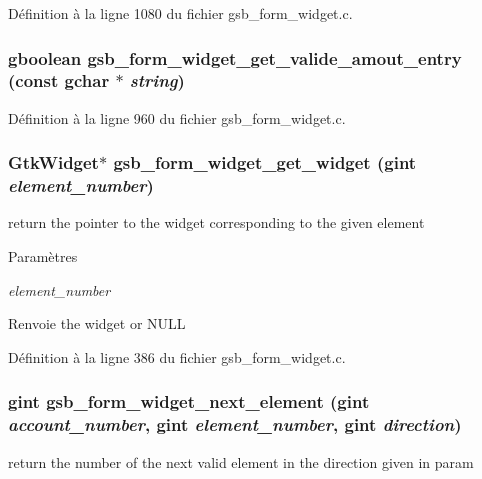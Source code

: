 Définition à la ligne 1080 du fichier gsb\_\-form\_\-widget.c.

\subsubsection[{gsb\_\-form\_\-widget\_\-get\_\-valide\_\-amout\_\-entry}]{\setlength{\rightskip}{0pt plus 5cm}gboolean gsb\_\-form\_\-widget\_\-get\_\-valide\_\-amout\_\-entry (const gchar $\ast$ {\em string})}\label{gsb__form__widget_8c_a8278574a493b1c7f20ba557c3cb82344}


Définition à la ligne 960 du fichier gsb\_\-form\_\-widget.c.

\subsubsection[{gsb\_\-form\_\-widget\_\-get\_\-widget}]{\setlength{\rightskip}{0pt plus 5cm}GtkWidget$\ast$ gsb\_\-form\_\-widget\_\-get\_\-widget (gint {\em element\_\-number})}\label{gsb__form__widget_8c_ad3d6e5f87dcce9c175f2f402fc63d94e}
return the pointer to the widget corresponding to the given element


\begin{DoxyParams}{Paramètres}
\item[{\em element\_\-number}]\end{DoxyParams}
\begin{DoxyReturn}{Renvoie}
the widget or NULL 
\end{DoxyReturn}


Définition à la ligne 386 du fichier gsb\_\-form\_\-widget.c.

\subsubsection[{gsb\_\-form\_\-widget\_\-next\_\-element}]{\setlength{\rightskip}{0pt plus 5cm}gint gsb\_\-form\_\-widget\_\-next\_\-element (gint {\em account\_\-number}, \/  gint {\em element\_\-number}, \/  gint {\em direction})}\label{gsb__form__widget_8c_ad677f89db19be4b34cfe527f41387617}
return the number of the next valid element in the direction given in param


